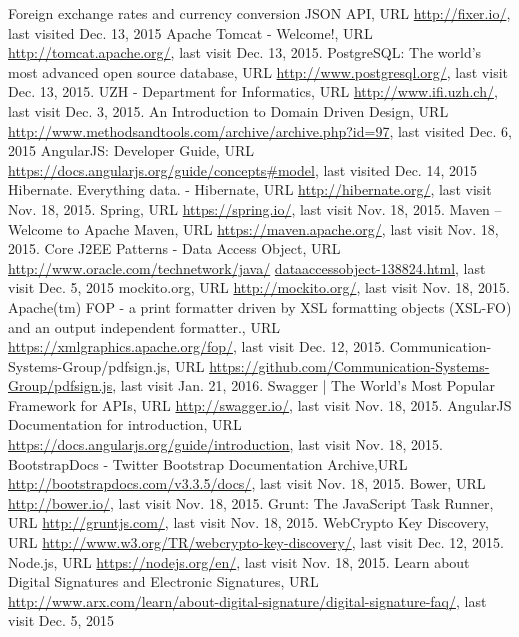 \begin{thebibliography}{99}

 Foreign exchange rates and currency conversion JSON API, URL \url{http://fixer.io/}, last visited Dec. 13, 2015
 Apache Tomcat - Welcome!, URL \url{http://tomcat.apache.org/}, last visit Dec. 13, 2015.
 PostgreSQL: The world's most advanced open source database, URL \url{http://www.postgresql.org/}, last visit Dec. 13, 2015.
 UZH - Department for Informatics, URL \url{http://www.ifi.uzh.ch/}, last visit Dec. 3, 2015.
 An Introduction to Domain Driven Design, URL \url{http://www.methodsandtools.com/archive/archive.php?id=97}, last visited Dec. 6, 2015
 AngularJS: Developer Guide, \newline URL \url{https://docs.angularjs.org/guide/concepts#model}, last visited Dec. 14, 2015
 Hibernate. Everything data. - Hibernate, URL \url{http://hibernate.org/}, last visit Nov. 18, 2015.
 Spring, URL \url{https://spring.io/}, last visit Nov. 18, 2015.
 Maven – Welcome to Apache Maven, URL \url{https://maven.apache.org/}, last visit Nov. 18, 2015.
 Core J2EE Patterns - Data Access Object, \newline URL \url{http://www.oracle.com/technetwork/java/} \newline \url{dataaccessobject-138824.html}, last visit Dec. 5, 2015
 mockito.org, URL \url{http://mockito.org/}, last visit Nov. 18, 2015.
 Apache(tm) FOP - a print formatter driven by XSL formatting objects (XSL-FO) and an output independent formatter., URL \url{https://xmlgraphics.apache.org/fop/}, last visit Dec. 12, 2015.
 Communication-Systems-Group/pdfsign.js, \newline URL \url{https://github.com/Communication-Systems-Group/pdfsign.js}, last visit Jan. 21, 2016.
 Swagger | The World's Most Popular Framework for APIs, URL \url{http://swagger.io/}, last visit Nov. 18, 2015.
 AngularJS Documentation for introduction, URL \url{https://docs.angularjs.org/guide/introduction}, last visit Nov. 18, 2015.
 BootstrapDocs - Twitter Bootstrap Documentation Archive,\newline URL \url{http://bootstrapdocs.com/v3.3.5/docs/}, last visit Nov. 18, 2015.
 Bower, URL \url{http://bower.io/}, last visit Nov. 18, 2015.
 Grunt: The JavaScript Task Runner, URL \url{http://gruntjs.com/}, last visit Nov. 18, 2015.
 WebCrypto Key Discovery, \newline URL \url{http://www.w3.org/TR/webcrypto-key-discovery/}, last visit Dec. 12, 2015.
 Node.js, URL \url{https://nodejs.org/en/}, last visit Nov. 18, 2015.
 Learn about Digital Signatures and Electronic Signatures, URL \url{http://www.arx.com/learn/about-digital-signature/digital-signature-faq/}, last visit Dec. 5, 2015




\end{thebibliography}
